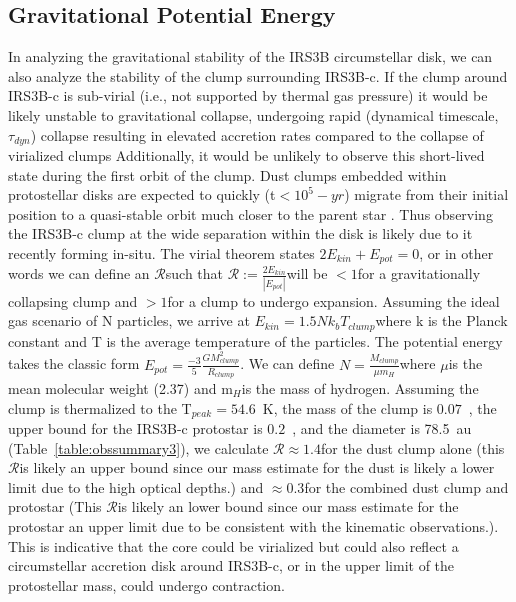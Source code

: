 \documentclass[twocolumn, 12pt, trackchanges]{aastex63}
\begin{document}
\subsection{Gravitational Potential Energy}\label{sec:gpe}
In analyzing the gravitational stability of the IRS3B circumstellar disk, we can also analyze the stability of the clump surrounding IRS3B-c. If the clump around IRS3B-c is sub-virial (i.e., not supported by thermal gas pressure) it would be likely unstable to gravitational collapse, undergoing rapid (dynamical timescale, $\tau_{dyn}$) collapse resulting in elevated accretion rates compared to the collapse of virialized clumps Additionally, it would be unlikely to observe this short-lived state during the first orbit of the clump. Dust clumps embedded within protostellar disks are expected to quickly (t$<10^{5}-yr$) migrate from their initial position to a quasi-stable orbit much closer to the parent star \citep{2019AA...631A...1V}. Thus observing the IRS3B-c clump at the wide separation within the disk is likely due to it recently forming in-situ. The virial theorem states $2E_{kin} + E_{pot}=0$, or in other words we can define an $\mathcal{R}$\space such that $\mathcal{R} := \frac{2E_{kin}}{|E_{pot}|}$\space will be $<1$\space for a gravitationally collapsing clump and $>1$\space for a clump to undergo expansion. Assuming the ideal gas scenario of N particles, we arrive at $E_{kin} = 1.5Nk_{b}T_{clump}$\space where k is the Planck constant and T is the average temperature of the particles. The potential energy takes the classic form $E_{pot} = \frac{-3}{5}\frac{GM^{2}_{clump}}{R_{clump}}$. We can define $N=\frac{M_{clump}}{\mu m_{H}}$\space where $\mu$\space is the mean molecular weight (2.37) and m$_{H}$\space is the mass of hydrogen. Assuming the clump is thermalized to the T$_{peak}=54.6$~K, the mass of the clump is $0.07$~\solm, the upper bound for the IRS3B-c protostar is $0.2$~\solm, and the diameter is 78.5~au (Table~\ref{table:obssummary3}), we calculate $\mathcal{R} \approx1.4$\space for the dust clump alone (this $\mathcal{R}$\space is likely an upper bound since our mass estimate for the dust is likely a lower limit due to the high optical depths.) and $\approx0.3$\space for the combined dust clump and protostar (This $\mathcal{R}$\space is likely an lower bound since our mass estimate for the protostar an upper limit due to be consistent with the kinematic observations.). This is indicative that the core could be virialized but could also reflect a circumstellar accretion disk around IRS3B-c, or in the upper limit of the protostellar mass, could undergo contraction.
\end{document}
